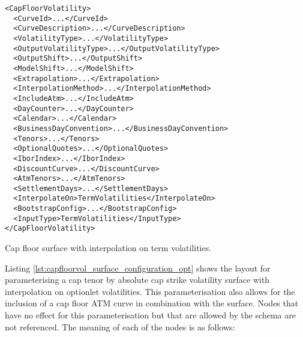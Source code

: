 \begin{longlisting}
\begin{verbatim}
<CapFloorVolatility>
  <CurveId>...</CurveId>
  <CurveDescription>...</CurveDescription>
  <VolatilityType>...</VolatilityType>
  <OutputVolatilityType>...</OutputVolatilityType>
  <OutputShift>...</OutputShift>
  <ModelShift>...</ModelShift>
  <Extrapolation>...</Extrapolation>
  <InterpolationMethod>...</InterpolationMethod>
  <IncludeAtm>...</IncludeAtm>
  <DayCounter>...</DayCounter>
  <Calendar>...</Calendar>
  <BusinessDayConvention>...</BusinessDayConvention>
  <Tenors>...</Tenors>
  <OptionalQuotes>...</OptionalQuotes>
  <IborIndex>...</IborIndex>
  <DiscountCurve>...</DiscountCurve>
  <AtmTenors>...</AtmTenors>
  <SettlementDays>...</SettlementDays>
  <InterpolateOn>TermVolatilities</InterpolateOn>
  <BootstrapConfig>...</BootstrapConfig>
  <InputType>TermVolatilities</InputType>
</CapFloorVolatility>
\end{verbatim}
\caption{Cap floor surface with interpolation on term volatilities.}
\label{lst:capfloorvol_surface_configuration_term}
\end{longlisting}

Listing \ref{lst:capfloorvol_surface_configuration_opt} shows the layout for parameterising a cap tenor by absolute cap strike volatility surface with interpolation on optionlet volatilities. This parameterisation also allows for the inclusion of a cap floor ATM curve in combination with the surface. Nodes that have no effect for this parameterisation but that are allowed by the schema are not referenced. The meaning of each of the nodes is as follows:

